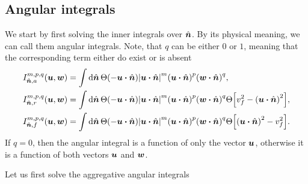 \documentclass[aps,prl,preprint,groupedaddress,10pt]{revtex4-2}
\begin{document}
\subsection{Angular integrals}
We start by first solving the inner integrals over $\hat{\vb*{n}}$. By its physical meaning, we can call
them angular integrals. Note, that $q$ can be either $0$ or $1$, meaning that the
corresponding term either do exist or is absent
\begin{equation}
    \begin{split}
        I_{\bn,a}^{m,p,q}\pqty{\bu,\bw}&=\int\dd{\bn}\Theta\pqty{-\bu\vdot\bn}
        \abs{\bu\vdot\bn}^m\pqty{\bu\vdot\bn}^p\pqty{\bw\vdot\bn}^q,\\
        I_{\bn,r}^{m,p,q}\pqty{\bu,\bw}&=\int\dd{\bn}\Theta\pqty{-\bu\vdot\bn}
        \abs{\bu\vdot\bn}^m\pqty{\bu\vdot\bn}^p\pqty{\bw\vdot\bn}^q
        \Theta\bqty{v_f^2-\pqty{\bu\vdot\bn}^2},\\
        I_{\bn,f}^{m,p,q}\pqty{\bu,\bw}&=\int\dd{\bn}\Theta\pqty{-\bu\vdot\bn}
        \abs{\bu\vdot\bn}^m\pqty{\bu\vdot\bn}^p\pqty{\bw\vdot\bn}^q
        \Theta\bqty{\pqty{\bu\vdot\bn}^2-v_f^2}.\\
    \end{split}
\end{equation}
If $q=0$, then the angular integral is a function of only the vector $\vb*{u}$, otherwise it is
a function of both vectors $\vb*{u}$ and $\vb*{w}$.

Let us first solve the aggregative angular integrals
\end{document}

